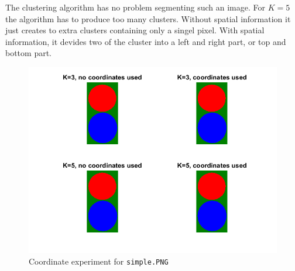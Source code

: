 The clustering algorithm has no problem segmenting such an image. For $K=5$ the algorithm has to produce too many clusters. Without spatial information it just creates to extra clusters containing only a singel pixel. With spatial information, it devides two of the cluster into a left and right part, or top and bottom part.
\begin{figure}[h]
\includegraphics[width = 0.9\linewidth]{figures/task2/simple_coordinates.png}
\caption{Coordinate experiment for \texttt{simple.PNG}}
\label{fig:simple:coords}
\end{figure}

